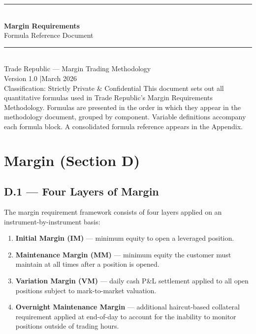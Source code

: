 \documentclass[9pt, a4paper]{extarticle}
\begin{document}

\begin{titlepage}
    \centering
    \vspace*{4cm}
    {\rule{\linewidth}{1.2pt}}\\[0.6em]
    {\Huge\bfseries Margin Requirements}\\[0.4em]
    {\Large Formula Reference Document}\\[0.4em]
    {\rule{\linewidth}{1.2pt}}\\[2em]
    {\large Trade Republic — Margin Trading Methodology}\\[0.5em]
    {\normalsize Version 1.0 \quad|\quad March 2026}\\[0.5em]
    {\normalsize Classification: Strictly Private \& Confidential}
    \vfill
    {\small This document sets out all quantitative formulas used in Trade Republic's
    Margin Requirements Methodology. Formulas are presented in the order in which
    they appear in the methodology document, grouped by component. Variable
    definitions accompany each formula block. A consolidated formula reference
    appears in the Appendix.}
\end{titlepage}

\tableofcontents
\newpage

\section{Margin (Section D)}
\label{sec:margin}

\subsection{D.1 — Four Layers of Margin}

The margin requirement framework consists of four layers applied on an
instrument-by-instrument basis:

\begin{enumerate}[leftmargin=2em]
    \item \textbf{Initial Margin (IM)} — minimum equity to open a leveraged position.
    \item \textbf{Maintenance Margin (MM)} — minimum equity the customer must maintain
          at all times after a position is opened.
    \item \textbf{Variation Margin (VM)} — daily cash P\&L settlement applied to all
          open positions subject to mark-to-market valuation.
    \item \textbf{Overnight Maintenance Margin} — additional haircut-based collateral
          requirement applied at end-of-day to account for the inability to monitor
          positions outside of trading hours.
\end{enumerate}
\end{document}
